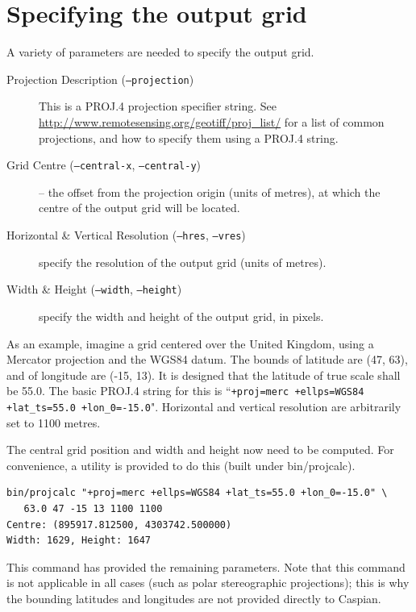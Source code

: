 \documentclass[a4paper,12pt]{article}
\begin{document}
\section{Specifying the output grid}
A variety of parameters are needed to specify the output grid.
\begin{description}
\item[Projection Description (\texttt{--projection})] This is a PROJ.4 projection specifier string. See \url{http://www.remotesensing.org/geotiff/proj_list/} for a list of common projections, and how to specify them using a PROJ.4 string.
\item[Grid Centre (\texttt{--central-x}, \texttt{--central-y})] -- the offset from the projection origin (units of metres), at which the centre of the output grid will be located.
\item[Horizontal \& Vertical Resolution (\texttt{--hres}, \texttt{--vres})] specify the resolution of the output grid (units of metres).
\item[Width \& Height (\texttt{--width}, \texttt{--height})] specify the width and height of the output grid, in pixels.
\end{description}

As an example, imagine a grid centered over the United Kingdom, using a Mercator projection and the WGS84 datum. The bounds of latitude are (47, 63), and of longitude are (-15, 13). It is designed that the latitude of true scale shall be 55.0. The basic PROJ.4 string for this is ``\texttt{+proj=merc +ellps=WGS84 +lat\_ts=55.0 +lon\_0=-15.0}". Horizontal and vertical resolution are arbitrarily set to 1100 metres.

The central grid position and width and height now need to be computed. For convenience, a utility is provided to do this (built under bin/projcalc).
\begin{verbatim}
bin/projcalc "+proj=merc +ellps=WGS84 +lat_ts=55.0 +lon_0=-15.0" \
   63.0 47 -15 13 1100 1100
Centre: (895917.812500, 4303742.500000)
Width: 1629, Height: 1647
\end{verbatim}
This command has provided the remaining parameters. Note that this command is not applicable in all cases (such as polar stereographic projections); this is why the bounding latitudes and longitudes are not provided directly to Caspian.
\end{document}
